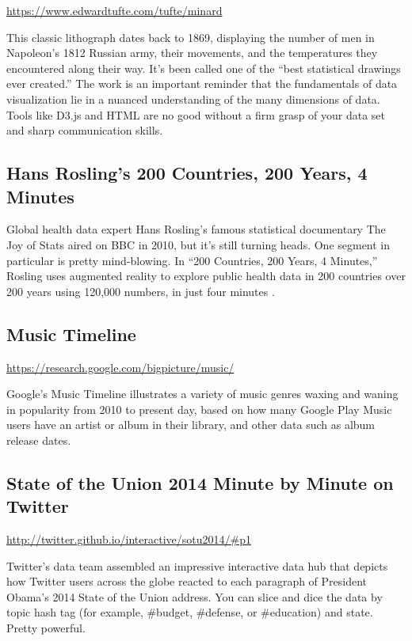 \documentclass[]{book}
\theoremstyle{definition}
\theoremstyle{definition}
\theoremstyle{definition}
\theoremstyle{remark}
\begin{document}
\url{https://www.edwardtufte.com/tufte/minard}

This classic lithograph dates back to 1869, displaying the number of men
in Napoleon's 1812 Russian army, their movements, and the temperatures
they encountered along their way. It's been called one of the ``best
statistical drawings ever created.'' The work is an important reminder
that the fundamentals of data visualization lie in a nuanced
understanding of the many dimensions of data. Tools like D3.js and HTML
are no good without a firm grasp of your data set and sharp
communication skills.

\subsection{Hans Rosling's 200 Countries, 200 Years, 4
Minutes}\label{hans-roslings-200-countries-200-years-4-minutes}

Global health data expert Hans Rosling's famous statistical documentary
The Joy of Stats aired on BBC in 2010, but it's still turning heads. One
segment in particular is pretty mind-blowing. In ``200 Countries, 200
Years, 4 Minutes,'' Rosling uses augmented reality to explore public
health data in 200 countries over 200 years using 120,000 numbers, in
just four minutes \citep{hans_rosling}.

\subsection{Music Timeline}\label{music-timeline}

\url{https://research.google.com/bigpicture/music/}

Google's Music Timeline illustrates a variety of music genres waxing and
waning in popularity from 2010 to present day, based on how many Google
Play Music users have an artist or album in their library, and other
data such as album release dates.

\subsection{State of the Union 2014 Minute by Minute on
Twitter}\label{state-of-the-union-2014-minute-by-minute-on-twitter}

\url{http://twitter.github.io/interactive/sotu2014/\#p1}

Twitter's data team assembled an impressive interactive data hub that
depicts how Twitter users across the globe reacted to each paragraph of
President Obama's 2014 State of the Union address. You can slice and
dice the data by topic hash tag (for example, \#budget, \#defense, or
\#education) and state. Pretty powerful.
\end{document}
